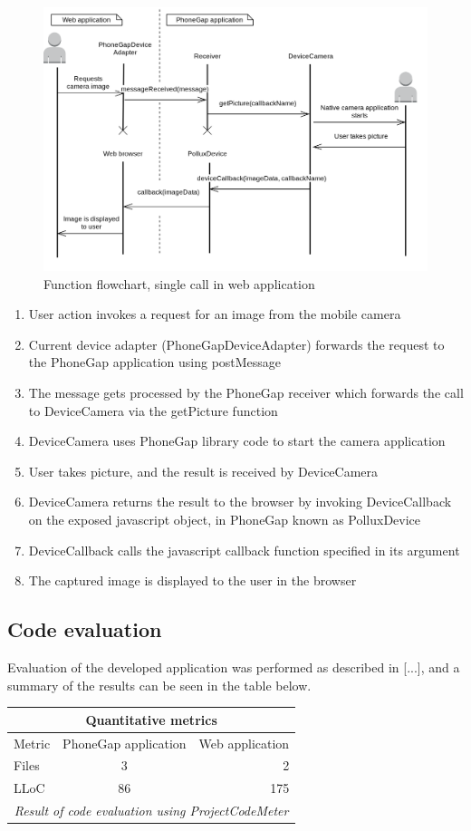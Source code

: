 \begin{figure}[h!]
	\centering
    \includegraphics[width=120mm,natwidth=800,natheight=600]{./img/phonegapfunctionflow.png}
    \caption{Function flowchart, single call in web application}
\end{figure}
\begin{enumerate}
	\item User action invokes a request for an image from the mobile camera 
	\item Current device adapter (PhoneGapDeviceAdapter) forwards the request to the PhoneGap application using postMessage
	\item The message gets processed by the PhoneGap receiver which forwards the call to DeviceCamera via the getPicture function
	\item DeviceCamera uses PhoneGap library code to start the camera application
	\item User takes picture, and the result is received by DeviceCamera
	\item DeviceCamera returns the result to the browser by invoking DeviceCallback on the exposed javascript object, in PhoneGap known as PolluxDevice
	\item DeviceCallback calls the javascript callback function specified in its argument
	\item The captured image is displayed to the user in the browser	
\end{enumerate}

\subsection{Code evaluation}
Evaluation of the developed application was performed as described in [...], and a summary of the results  can be seen in the table below.

\begin{tabular}{ | l | c | r | }
    \hline
    \multicolumn{3}{|c|}{Quantitative metrics} \\
    \hline
	Metric & PhoneGap application &  Web application \\
	\hline
	Files & 3 & 2\\
	LLoC & 86 & 175\\	
	\hline
	\multicolumn{3}{c}{\emph{Result of code evaluation using ProjectCodeMeter}}
\end{tabular}